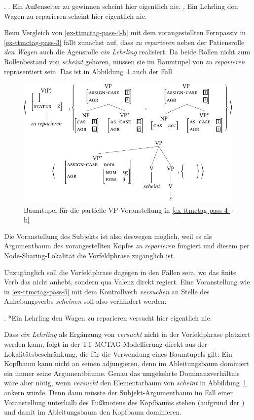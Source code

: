 \ex. \label{ex-ttmctag-pass-4} 
\a. \label{ex-ttmctag-pass-4-a} Ein Au\ss enseiter zu gewinnen scheint hier eigentlich nie. \hfill \citep[(265)]{Meurers:99}
\b. \label{ex-ttmctag-pass-4-b} Ein Lehrling den Wagen zu reparieren scheint hier eigentlich nie.

\largerpage%
Beim Vergleich von \ref{ex-ttmctag-pass-4-b} mit dem vorangestellten Fernpassiv in \ref{ex-ttmctag-pass-3} fällt zunächst auf, dass {\it zu reparieren} neben der Patiensrolle {\it den Wagen} auch die Agensrolle {\it ein Lehrling} realisiert. Da beide Rollen nicht zum Rollenbestand von {\it scheint} gehören, müssen sie im Baumtupel von {\it zu reparieren} repräsentiert sein. Das ist in Abbildung~\ref{fig-ttmctag-fern-4} auch der Fall.
\begin{figure}[t]
\centering
\includegraphics{graphics/abb725.pdf}
\caption{\label{fig-ttmctag-fern-4}Baumtupel für die partielle VP-Voranstellung in \ref{ex-ttmctag-pass-4-b}}
\end{figure}
Die Voranstellung des Subjekts ist also deswegen möglich, weil es als Argumentbaum des vorangestellten Kopfes {\it zu reparieren} fungiert und diesem per Node-Sharing-Lokalität die Vorfeldphrase zugänglich ist.

Unzugänglich soll die Vorfeldphrase dagegen in den Fällen sein, wo das finite Verb das  nicht anhebt, sondern qua Valenz direkt regiert. Eine Voranstellung wie in \ref{ex-ttmctag-pass-5} mit dem Kontrollverb {\it versuchen} an Stelle des Anhebungsverbs {\it scheinen} soll also verhindert werden:  

\ex. \label{ex-ttmctag-pass-5} *Ein Lehrling den Wagen zu reparieren versucht hier eigentlich nie.

Dass {\it ein Lehrling} als Ergänzung von {\it versucht} nicht in der Vorfeldphrase platziert werden kann, folgt in der TT-MCTAG-Modellierung direkt aus der Lokalitätsbeschränkung, die für die Verwendung eines Baumtupels gilt: Ein Kopfbaum kann nicht an seinen  adjungieren, denn im Ableitungsbaum dominiert ein  immer seine Argumentbäume.  Genau das umgekehrte Dominanzverhältnis wäre aber nötig, wenn \textit{versucht} den Elementarbaum von \textit{scheint} in Abbildung~\ref{fig-ttmctag-fern-4} ankern würde. Denn dann müsste der Subjekt-Argumentbaum im Fall einer Voranstellung unterhalb des Fu\ss knotens des Kopfbaums stehen (aufgrund der ) und damit im Ableitungsbaum den Kopfbaum dominieren.

